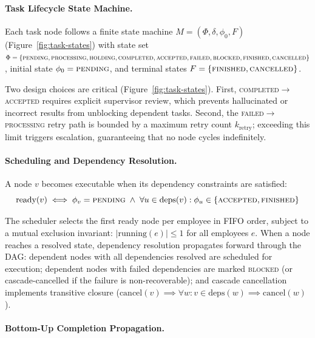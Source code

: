 \documentclass[11pt,a4paper]{article}
\begin{document}
\paragraph{Task Lifecycle State Machine.} Each task node follows a finite state machine $M = (\Phi, \delta, \phi_0, F)$ (Figure~\ref{fig:task-states}) with state set $\Phi = \{\textsc{pending}, \textsc{processing}, \textsc{holding}, \textsc{completed}, \textsc{accepted}, \textsc{failed}, \textsc{blocked}, \textsc{finished}, \textsc{cancelled}\}$, initial state $\phi_0 = \textsc{pending}$, and terminal states $F = \{\textsc{finished}, \textsc{cancelled}\}$.



Two design choices are critical (Figure~\ref{fig:task-states}). First, \textsc{completed}$\to$\textsc{accepted} requires explicit supervisor review, which prevents hallucinated or incorrect results from unblocking dependent tasks. Second, the \textsc{failed}$\to$\textsc{processing} retry path is bounded by a maximum retry count $k_{\text{retry}}$; exceeding this limit triggers escalation, guaranteeing that no node cycles indefinitely.

\paragraph{Scheduling and Dependency Resolution.} A node $v$ becomes executable when its dependency constraints are satisfied:
\begin{equation}
\text{ready}(v) \iff \phi_v = \textsc{pending} \;\wedge\; \forall u \in \text{deps}(v) : \phi_u \in \{\textsc{accepted}, \textsc{finished}\}
\end{equation}

The scheduler selects the first ready node per employee in FIFO order, subject to a mutual exclusion invariant: $|\text{running}(e)| \leq 1$ for all employees $e$.  When a node reaches a resolved state, dependency resolution propagates forward through the DAG: dependent nodes with all dependencies resolved are scheduled for execution; dependent nodes with failed dependencies are marked \textsc{blocked} (or cascade-cancelled if the failure is non-recoverable); and cascade cancellation implements transitive closure ($\text{cancel}(v) \implies \forall w : v \in \text{deps}(w) \implies \text{cancel}(w)$).

\paragraph{Bottom-Up Completion Propagation.}
\end{document}

